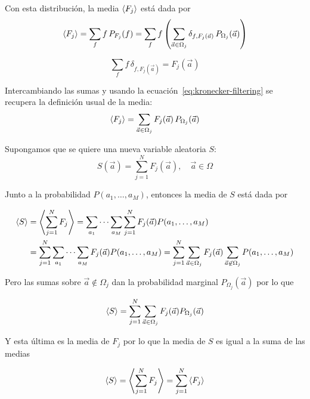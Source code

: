 Con esta distribución, la media $\left\langle F_j \right\rangle$ está dada por
\begin{equation}
  \left\langle F_j \right\rangle
  = \sum_f f \, P_{F_j}(f)
  = \sum_f f \left(
    \sum_{\vec a \in \Omega_j} \delta_{f, F_j(\vec a)} \,
    P_{\Omega_j}(\vec a)
  \right)
  \label{eq:mean-fj-delta}
\end{equation}

\begin{equation}
  \sum_f f \, \delta_{f, F_j(\vec a)} = F_j(\vec a)
  \label{eq:kronecker-filtering}
\end{equation}

Intercambiando las sumas y usando la ecuación~\ref{eq:kronecker-filtering} se
recupera la definición usual de la media:
\begin{equation}
  \left\langle F_j \right\rangle
  = \sum_{\vec a \in \Omega_j} F_j(\vec a) \, P_{\Omega_j}(\vec a)
  \label{eq:mean:fj}
\end{equation}

Supongamos que se quiere una nueva variable aleatoria $S$:
\begin{equation}
  S(\vec a) = \sum_{j=1}^N F_j(\vec a), \quad \vec a \in \Omega
  \label{eq:s-set}
\end{equation}

Junto a la probabilidad $P(a_1, \ldots, a_M)$, entonces la media de $S$ está
dada por

\begin{align*}
  \left\langle S \right\rangle &= \left\langle \sum_{j = 1}^N F_j \right\rangle
  = \sum_{a_1}\cdots \sum_{a_M} \sum_{j = 1}^N F_j(\vec{a}) P(a_1,
  \ldots, a_M)\\
  &= \sum_{j = 1}^N \sum_{a_1} \cdots \sum_{a_M} F_j(\vec{a}) P(a_1,
  \ldots, a_M)
  = \sum_{j = 1}^N \sum_{\vec{a} \in \Omega_j} F_j(\vec{a} )
  \sum_{\vec{a} \not \in \Omega_j} P(a_1, \ldots, a_M) \\
\end{align*}

Pero las sumas sobre $\vec{a} \not \in \Omega_j$ dan la probabilidad marginal
$P_{\Omega_j}(\vec{a})$ por lo que

\begin{align*}
  \left\langle S \right\rangle = \sum_{j=1}^N \sum_{\vec a \in \Omega_j} F_j(\vec a)
  P_{\Omega_j}(\vec{a})
\end{align*}

Y esta última es la media de $F_j$ por lo que la media de $S$ es igual a
la suma de las medias

\begin{equation}
  \left\langle S \right\rangle = \left\langle \sum_{j = 1}^N F_j \right\rangle = \sum_{j = 1}^N \left\langle F_j \right\rangle
  \label{eq:mean-s}
\end{equation}

